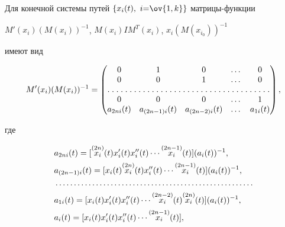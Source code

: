 \begin{lem}


Для конечной системы путей $\{x_i(t), \ i{=}\ov{1,k}\}$ матрицы-функции 


$M'(x_i)(M(x_i))^{-1}$, $M(x_i)I M^T(x_i)$, $x_i(M(x_{i_0}))^{-1}$


имеют вид


$$


M'(x_i)(M(x_i))^{-1}=


\begin{pmatrix}


0 & 1 & 0 & \dotsc & 0 \\


0 & 0 & 1 & \dotsc & 0 \\


\hdotsfor[1.5]{5} \\


0 & 0 & 0 & \dotsc & 1 \\


a_{2n i}(t) & a_{(2n-1)i}(t) & a_{(2n-2)i}(t) &


\dotsc & a_{1i}(t)


\end{pmatrix}


,


$$


где


\begin{align*}


& a_{2n i}(t)=[\up{(2n)}{x_i}(t)x'_i(t)x''_i(t)\dotsb


\up{(2n-1)}{x_i}(t)](a_i(t))^{-1}, \\


%


& a_{(2n-1)i}(t)=[x_i(t)\up{(2n)}{x_i}(t)x''_i(t)\dotsb


\up{(2n-1)}{x_i}(t)](a_i(t))^{-1},\\


%


&\dotsc\dotsc\dotsc\dotsc\dotsc\dotsc\dotsc\dotsc\dotsc


\dotsc\dotsc\dotsc\dotsc\dotsc\dotsc\dotsc\dotsc\dotsc\\


%


& a_{1i}(t)=[x_i(t)x'_i(t)x''_i(t)\dotsb


\up{(2n-2)}{x_i}(t)\up{(2n)}{x_i}(t)](a_i(t))^{-1}, \\


%


& a_i(t)=[x_i(t)x'_i(t)x''_i(t)\dotsb\up{(2n-1)}{x_i}(t)],



\end{align*}
\end{lem}

